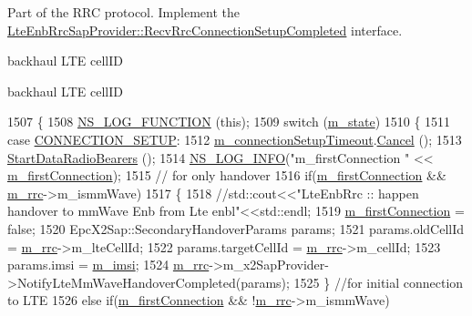 Part of the R\+RC protocol. Implement the \hyperlink{classns3_1_1LteEnbRrcSapProvider_aa167fea38bb3d88f6c87a4fbfbb2669e}{Lte\+Enb\+Rrc\+Sap\+Provider\+::\+Recv\+Rrc\+Connection\+Setup\+Completed} interface. 

backhaul L\+TE cell\+ID

backhaul L\+TE cell\+ID 
\begin{DoxyCode}
1507 \{
1508   \hyperlink{log-macros-disabled_8h_a90b90d5bad1f39cb1b64923ea94c0761}{NS\_LOG\_FUNCTION} (\textcolor{keyword}{this});
1509   \textcolor{keywordflow}{switch} (\hyperlink{classns3_1_1UeManager_aaed4b2490297cb912e743084f1a27b08}{m\_state})
1510     \{
1511     \textcolor{keywordflow}{case} \hyperlink{classns3_1_1UeManager_a2f4085fdd18d7125c27da44a5b8b6808a54b5e529e9da2b99970d8939dbd9832e}{CONNECTION\_SETUP}:
1512       \hyperlink{classns3_1_1UeManager_afa30ea647e5d93b6c58d46b92e681044}{m\_connectionSetupTimeout}.\hyperlink{classns3_1_1EventId_a993ae94e48e014e1afd47edb16db7a11}{Cancel} ();
1513       \hyperlink{classns3_1_1UeManager_ad03d22d27261b89b6b575e16b5855bd5}{StartDataRadioBearers} ();
1514       \hyperlink{group__logging_gafbd73ee2cf9f26b319f49086d8e860fb}{NS\_LOG\_INFO}(\textcolor{stringliteral}{"m\_firstConnection "} << \hyperlink{classns3_1_1UeManager_a80bbce0e682b9f64dd49292c0388d79d}{m\_firstConnection});
1515       \textcolor{comment}{// for only handover}
1516       \textcolor{keywordflow}{if}(\hyperlink{classns3_1_1UeManager_a80bbce0e682b9f64dd49292c0388d79d}{m\_firstConnection} && \hyperlink{classns3_1_1UeManager_ab4405e9f354c66e7c1a4c95832290f5b}{m\_rrc}->m\_ismmWave)
1517       \{
1518        \textcolor{comment}{//std::cout<<"LteEnbRrc :: happen handover to mmWave Enb from Lte enbl"<<std::endl;}
1519          \hyperlink{classns3_1_1UeManager_a80bbce0e682b9f64dd49292c0388d79d}{m\_firstConnection} = \textcolor{keyword}{false};
1520         EpcX2Sap::SecondaryHandoverParams params;
1521         params.oldCellId = \hyperlink{classns3_1_1UeManager_ab4405e9f354c66e7c1a4c95832290f5b}{m\_rrc}->m\_lteCellId;
1522         params.targetCellId = \hyperlink{classns3_1_1UeManager_ab4405e9f354c66e7c1a4c95832290f5b}{m\_rrc}->m\_cellId;
1523         params.imsi = \hyperlink{classns3_1_1UeManager_a868dda076ecfc1d4202e357c16223d84}{m\_imsi};
1524         \hyperlink{classns3_1_1UeManager_ab4405e9f354c66e7c1a4c95832290f5b}{m\_rrc}->m\_x2SapProvider->NotifyLteMmWaveHandoverCompleted(params);
1525       \} \textcolor{comment}{//for initial connection to LTE}
1526       \textcolor{keywordflow}{else} \textcolor{keywordflow}{if}(\hyperlink{classns3_1_1UeManager_a80bbce0e682b9f64dd49292c0388d79d}{m\_firstConnection} && !\hyperlink{classns3_1_1UeManager_ab4405e9f354c66e7c1a4c95832290f5b}{m\_rrc}->m\_ismmWave)

\end{DoxyCode}

